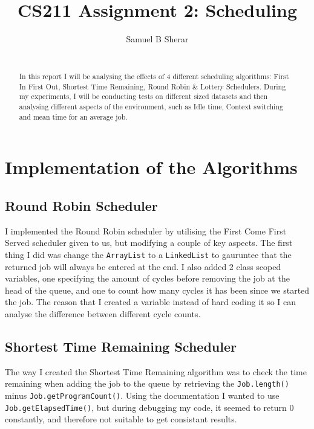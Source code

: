 \documentclass{acm_proc_article-sp}
\begin{document}
\title{CS211 Assignment 2: Scheduling}
\author{
  \alignauthor 
  Samuel B Sherar\\
  \
}
\maketitle

\begin{abstract}
In this report I will be analysing the effects of 4 different scheduling algorithms: First In First Out, Shortest Time Remaining, Round Robin \& Lottery Schedulers. During my experiments, I will be conducting tests on different sized datasets and then analysing different aspects of the environment, such as Idle time, Context switching and mean time for an average job.

\end{abstract}
\newpage

\section{Implementation of the Algorithms}
\subsection{Round Robin Scheduler}

I implemented the Round Robin scheduler by utilising the First Come First Served scheduler given to us, but modifying a couple of key aspects. The first thing I did was change the \texttt{ArrayList} to a \texttt{LinkedList} to gauruntee that the returned job will always be entered at the end. I also added 2 class scoped variables, one specifying the amount of cycles before removing the job at the head of the queue, and one to count how many cycles it has been since we started the job. The reason that I created a variable instead of hard coding it so I can analyse the difference between different cycle counts.

\subsection{Shortest Time Remaining Scheduler}

The way I created the Shortest Time Remaining algorithm was to check the time remaining when adding the job to the queue by retrieving the \texttt{Job.length()} minus \texttt{Job.getProgramCount()}. Using the documentation I wanted to use \texttt{Job.getElapsedTime()}, but during debugging my code, it seemed to return 0 constantly, and therefore not suitable to get consistant results.
\end{document}
